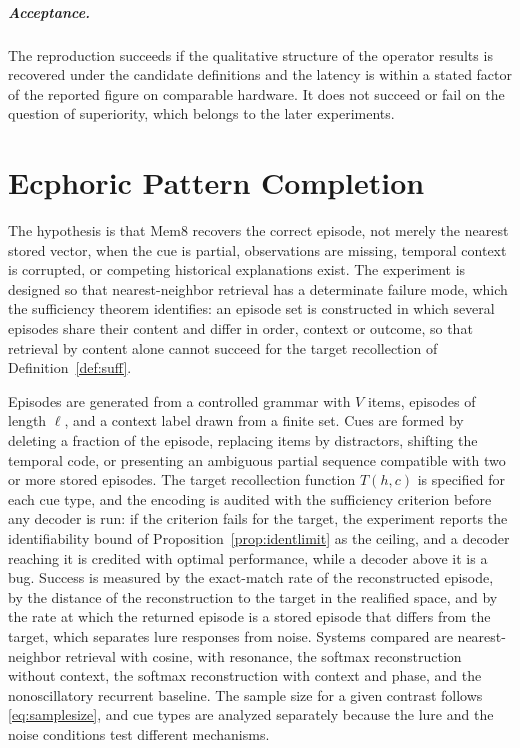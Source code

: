 \paragraph{Acceptance.} The reproduction succeeds if the qualitative structure of the operator results is recovered under the candidate definitions and the latency is within a stated factor of the reported figure on comparable hardware. It does not succeed or fail on the question of superiority, which belongs to the later experiments.

\chapter{Ecphoric Pattern Completion}\label{ch:completion}

The hypothesis is that Mem8 recovers the correct episode, not merely the nearest stored vector, when the cue is partial, observations are missing, temporal context is corrupted, or competing historical explanations exist. The experiment is designed so that nearest-neighbor retrieval has a determinate failure mode, which the sufficiency theorem identifies: an episode set is constructed in which several episodes share their content and differ in order, context or outcome, so that retrieval by content alone cannot succeed for the target recollection of Definition~\ref{def:suff}.

Episodes are generated from a controlled grammar with $V$ items, episodes of length $\ell$, and a context label drawn from a finite set. Cues are formed by deleting a fraction of the episode, replacing items by distractors, shifting the temporal code, or presenting an ambiguous partial sequence compatible with two or more stored episodes. The target recollection function $T(h,c)$ is specified for each cue type, and the encoding is audited with the sufficiency criterion before any decoder is run: if the criterion fails for the target, the experiment reports the identifiability bound of Proposition~\ref{prop:identlimit} as the ceiling, and a decoder reaching it is credited with optimal performance, while a decoder above it is a bug. Success is measured by the exact-match rate of the reconstructed episode, by the distance of the reconstruction to the target in the realified space, and by the rate at which the returned episode is a stored episode that differs from the target, which separates lure responses from noise. Systems compared are nearest-neighbor retrieval with cosine, with resonance, the softmax reconstruction without context, the softmax reconstruction with context and phase, and the nonoscillatory recurrent baseline. The sample size for a given contrast follows \eqref{eq:samplesize}, and cue types are analyzed separately because the lure and the noise conditions test different mechanisms.

